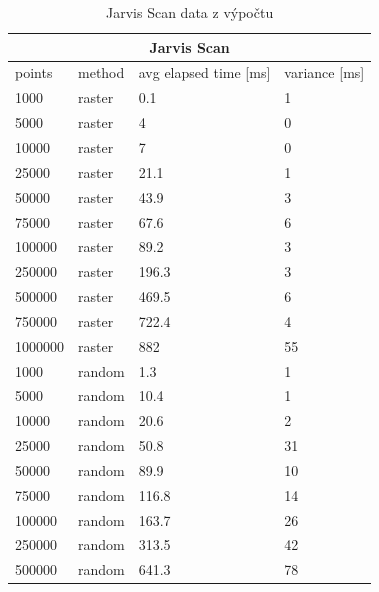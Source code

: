 \documentclass[12pt]{article}
\begin{document}
\begin{table}[h!]
\centering
\caption{Jarvis Scan data z výpočtu}
\begin{tabular}{|l|l|l|l|}
\hline
\multicolumn{4}{|c|}{\textbf{Jarvis Scan}}                       \\ \hline
points  & method & avg elapsed time {[}ms{]} & variance {[}ms{]} \\ \hline
1000    & raster & 0.1                       & 1                 \\ \hline
5000    & raster & 4                         & 0                 \\ \hline
10000   & raster & 7                         & 0                 \\ \hline
25000   & raster & 21.1                      & 1                 \\ \hline
50000   & raster & 43.9                      & 3                 \\ \hline
75000   & raster & 67.6                      & 6                 \\ \hline
100000  & raster & 89.2                      & 3                 \\ \hline
250000  & raster & 196.3                     & 3                 \\ \hline
500000  & raster & 469.5                     & 6                 \\ \hline
750000  & raster & 722.4                     & 4                 \\ \hline
1000000 & raster & 882                       & 55                \\ \hline
1000    & random & 1.3                       & 1                 \\ \hline
5000    & random & 10.4                      & 1                 \\ \hline
10000   & random & 20.6                      & 2                 \\ \hline
25000   & random & 50.8                      & 31                \\ \hline
50000   & random & 89.9                      & 10                \\ \hline
75000   & random & 116.8                     & 14                \\ \hline
100000  & random & 163.7                     & 26                \\ \hline
250000  & random & 313.5                     & 42                \\ \hline
500000  & random & 641.3                     & 78                \\ \hline

\end{tabular}
\end{table}
\end{document}
